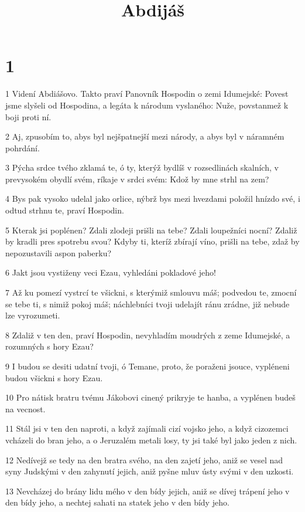 

\title{Abdijáš}

\chapter{1}

\par 1 Videní Abdiášovo. Takto praví Panovník Hospodin o zemi Idumejské: Povest jsme slyšeli od Hospodina, a legáta k národum vyslaného: Nuže, povstanmež k boji proti ní.
\par 2 Aj, zpusobím to, abys byl nejšpatnejší mezi národy, a abys byl v náramném pohrdání.
\par 3 Pýcha srdce tvého zklamá te, ó ty, kterýž bydlíš v rozsedlinách skalních, v prevysokém obydlí svém, ríkaje v srdci svém: Kdož by mne strhl na zem?
\par 4 Bys pak vysoko udelal jako orlice, nýbrž bys mezi hvezdami položil hnízdo své, i odtud strhnu te, praví Hospodin.
\par 5 Kterak jsi poplénen? Zdali zlodeji prišli na tebe? Zdali loupežníci nocní? Zdaliž by kradli pres spotrebu svou? Kdyby ti, kteríž zbírají víno, prišli na tebe, zdaž by nepozustavili aspon paberku?
\par 6 Jakt jsou vystiženy veci Ezau, vyhledáni pokladové jeho!
\par 7 Až ku pomezí vystrcí te všickni, s kterýmiž smlouvu máš; podvedou te, zmocní se tebe ti, s nimiž pokoj máš; náchlebníci tvoji udelajít ránu zrádne, již nebude lze vyrozumeti.
\par 8 Zdaliž v ten den, praví Hospodin, nevyhladím moudrých z zeme Idumejské, a rozumných s hory Ezau?
\par 9 I budou se desiti udatní tvoji, ó Temane, proto, že poraženi jsouce, vypléneni budou všickni s hory Ezau.
\par 10 Pro nátisk bratru tvému Jákobovi cinený prikryje te hanba, a vyplénen budeš na vecnost.
\par 11 Stál jsi v ten den naproti, a když zajímali cizí vojsko jeho, a když cizozemci vcházeli do bran jeho, a o Jeruzalém metali losy, ty jsi také byl jako jeden z nich.
\par 12 Nedívejž se tedy na den bratra svého, na den zajetí jeho, aniž se vesel nad syny Judskými v den zahynutí jejich, aniž pyšne mluv ústy svými v den uzkosti.
\par 13 Nevcházej do brány lidu mého v den bídy jejich, aniž se dívej trápení jeho v den bídy jeho, a nechtej sahati na statek jeho v den bídy jeho.
